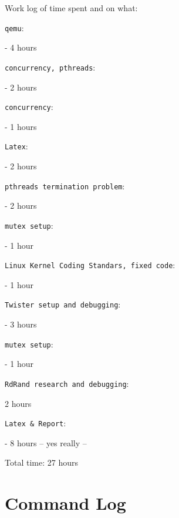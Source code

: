 \documentclass[10pt,letterpaper]{article}
\begin{document}
Work log of time spent and on what:
\begin{description}
  \item \texttt{qemu}: \date{April 3} - 4 hours
  \item \texttt{concurrency, pthreads}: \date{April 5} - 2 hours
  \item \texttt{concurrency}: \date{April 6} - 1 hours
  \item \texttt{Latex}: \date{April 7} - 2 hours
  \item \texttt{pthreads termination problem}: \date{April 8} - 2 hours
  \item \texttt{mutex setup}: \date{April 8} - 1 hour
  \item \texttt{Linux Kernel Coding Standars, fixed code}: \date{April 8} - 1 hour
  \item \texttt{Twister setup and debugging}: \date{April 8} - 3 hours
  \item \texttt{mutex setup}: \date{April 8} - 1 hour
  \item \texttt{RdRand research and debugging}: \date{April 9} 2 hours
  \item \texttt{Latex \& Report}: \date{April 10} - 8 hours -- yes really --
\end{description}
Total time: 27 hours

\section{Command Log}
\end{document}
